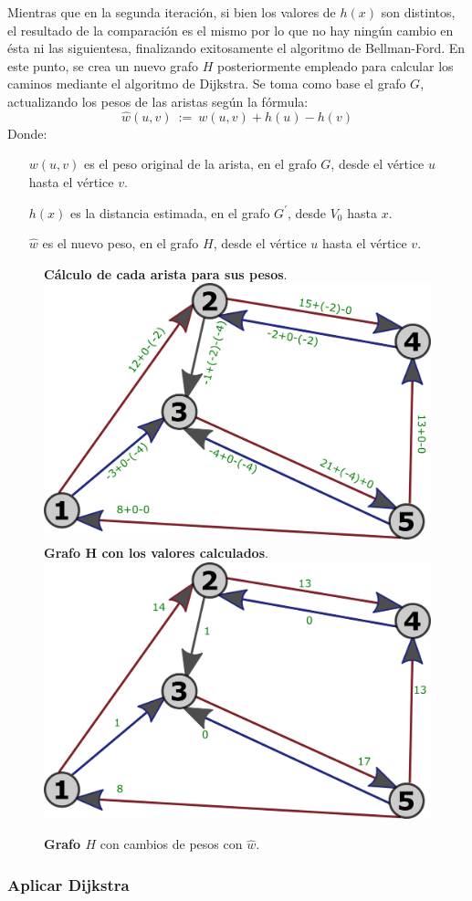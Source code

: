 \documentclass[../tp2_grupo404.tex]{subfiles}
\begin{document}
Mientras que en la segunda iteración, si bien los valores de $h(x)$
son distintos, el resultado de la comparación es el mismo
por lo que no hay ningún cambio en ésta ni las siguientesa,
finalizando exitosamente el algoritmo de Bellman-Ford.
En este punto, se crea un nuevo grafo $H$ posteriormente empleado
para calcular los caminos mediante el algoritmo de Dijkstra.
Se toma como base el grafo $G$, actualizando los pesos de las aristas
según la fórmula:
$$\hat{w}(u,v)~:=~w(u,v) + h(u) - h(v)$$
Donde:
\begin{itemize}
    \item[$w(u,v)$] es el peso original de la arista, en el grafo $G$, desde el vértice $u$ hasta el vértice $v$.
    \item[$h(x)$] es la distancia estimada, en el grafo $G^\prime$, desde $V_0$ hasta $x$.
    \item[$\hat{w}$] es el nuevo peso, en el grafo $H$, desde el vértice $u$ hasta el vértice $v$.
\end{itemize} 

\begin{figure}[H]
    \centering
    \subcaptionbox
        {\label{fig:GrafoH_calculos}\textbf{Cálculo de cada arista para sus pesos}.}
        {\includegraphics[width=0.4\linewidth,angle=0,origin=c]{out/ford/ford1G.png}}
    \subcaptionbox
        {\label{fig:GrafoH_valores}\textbf{Grafo H con los valores calculados}.}
        {\includegraphics[width=0.4\linewidth,angle=0,origin=c]{out/ford/ford1H.png}}
    \caption{\label{fig:GrafoH}\textbf{Grafo $H$} con cambios de pesos con $\hat{w}$.}
\end{figure}

\subsubsection{Aplicar Dijkstra}\label{sec:parte1_4_2}
\end{document}

